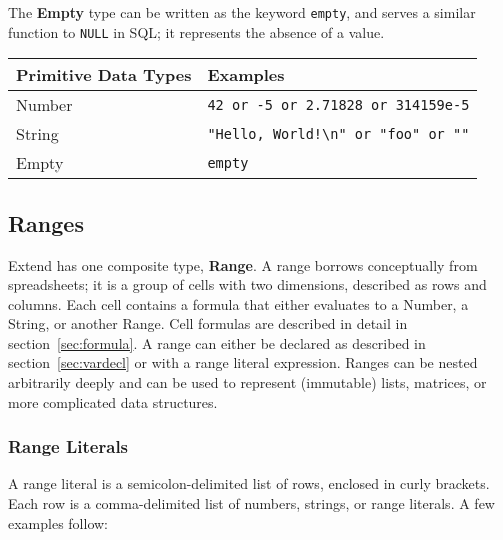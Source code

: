 		The \textbf{Empty} type can be written as the keyword \texttt{empty}, and serves a similar function to \texttt{NULL} in SQL; it represents the absence of a value.
		\newline
		\begin{table}[H]
		\centering
		\begin{tabular} {| l | l |}
			\hline
			\textbf{Primitive Data Types} & \textbf{Examples} \\ \hline
			Number & \texttt{42 or -5 or 2.71828 or 314159e-5} \\ \hline
			String & \texttt{"Hello, World!\textbackslash n" or "foo" or ""} \\ \hline
			Empty & \texttt{empty} \\ \hline
		\end{tabular}
		\end{table}
	\subsection{Ranges}
		Extend has one composite type, \textbf{Range}. A range borrows conceptually from spreadsheets; it is a group of cells with two dimensions, described as rows and columns. Each cell contains a formula that either evaluates to a Number, a String, or another Range. Cell formulas are described in detail in section~\ref{sec:formula}. A range can either be declared as described in section~\ref{sec:vardecl} or with a range literal expression. Ranges can be nested arbitrarily deeply and can be used to represent (immutable) lists, matrices, or more complicated data structures.
\subsubsection{Range Literals}
		A range literal is a semicolon-delimited list of rows, enclosed in curly brackets. Each row is a comma-delimited list of numbers, strings, or range literals. A few examples follow:
		
